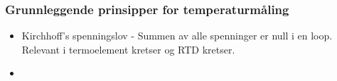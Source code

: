 \documentclass[aspectratio=169,xcolor=dvipsnames]{beamer}
\begin{document}
%
%
%
%
%
%
%
\begin{frame}
	\frametitle{Grunnleggende prinsipper for temperaturmåling}
	\begin{itemize}
		\item Kirchhoff's spenningslov - Summen av alle spenninger er null i en loop. Relevant i termoelement kretser og RTD kretser. 
		\item 
	\end{itemize}

	
\end{frame}
\end{document}

